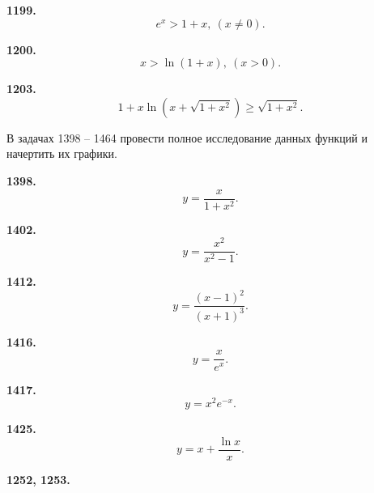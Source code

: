 \documentclass[a4paper,10pt]{article}
\newcommand{\exercize}[1]{\textbf{#1.}}
\begin{document}
\exercize{1199} \[ e^x > 1 + x,\ (x \not= 0). \]

\exercize{1200} \[ x > \ln{(1 + x)},\ (x > 0). \]

\exercize{1203} \[ 1 + x \ln{(x + \sqrt{1 + x^2})} \ge \sqrt{1 + x^2}. \]

В задачах 1398 -- 1464 провести полное исследование данных функций и начертить их графики.

\exercize{1398} \[ y = \frac{x}{1 + x^2}. \]

\exercize{1402} \[ y = \frac{x^2}{x^2 - 1}. \]

\exercize{1412} \[ y = \frac{(x - 1)^2}{(x + 1)^3}. \]

\exercize{1416} \[ y = \frac{x}{e^x}. \]

\exercize{1417} \[ y = x^2 e^{-x}. \]

\exercize{1425} \[ y = x + \frac{\ln{x}}{x}. \]

\exercize{1252, 1253}
\end{document}
